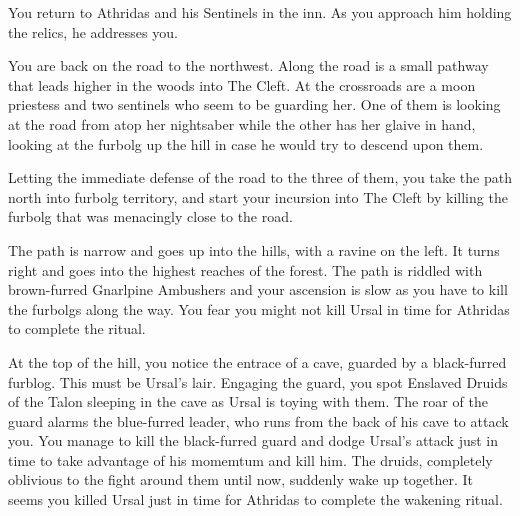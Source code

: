 You return to Athridas and his Sentinels in the inn. As you approach him holding the relics, he addresses you.




You are back on the road to the northwest. Along the road is a small pathway that leads higher in the woods into The Cleft. At the crossroads are a moon priestess and two sentinels who seem to be guarding her. One of them is looking at the road from atop her nightsaber while the other has her glaive in hand, looking at the furbolg up the hill in case he would try to descend upon them.



Letting the immediate defense of the road to the three of them, you take the path north into furbolg territory, and start your incursion into The Cleft by killing the furbolg that was menacingly close to the road.

The path is narrow and goes up into the hills, with a ravine on the left. It turns right and goes into the highest reaches of the forest. The path is riddled with brown-furred Gnarlpine Ambushers and your ascension is slow as you have to kill the furbolgs along the way. You fear you might not kill Ursal in time for Athridas to complete the ritual.

At the top of the hill, you notice the entrace of a cave, guarded by a black-furred furblog. This must be Ursal's lair. Engaging the guard, you spot Enslaved Druids of the Talon sleeping in the cave as Ursal is toying with them. The roar of the guard alarms the blue-furred leader, who runs from the back of his cave to attack you. You manage to kill the black-furred guard and dodge Ursal's attack just in time to take advantage of his momemtum and kill him. The druids, completely oblivious to the fight around them until now, suddenly wake up together. It seems you killed Ursal just in time for Athridas to complete the wakening ritual.

